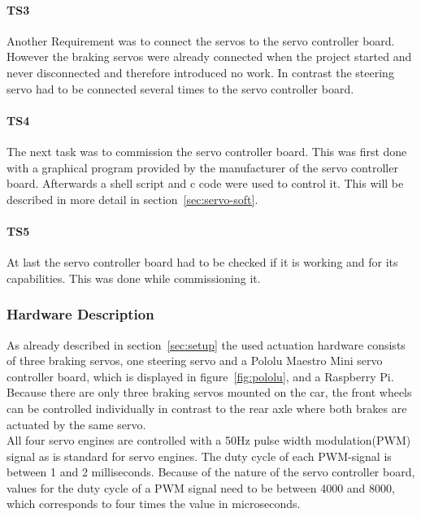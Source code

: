 \paragraph{\textbf{TS3}}
Another Requirement was to connect the servos to the servo controller board. However the braking servos were already connected when the project started and never disconnected and therefore introduced no work. In contrast the steering servo had to be connected several times to the servo controller board.

\paragraph{\textbf{TS4}}
The next task was to commission the servo controller board. This was first done with a graphical program provided by the manufacturer of the servo controller board. Afterwards a shell script and c code were used to control it. This will be described in more detail in section~\ref{sec:servo-soft}.

\paragraph{\textbf{TS5}}
At last the servo controller board had to be checked if it is working and for its capabilities. This was done while commissioning it.

\subsubsection{Hardware Description}
\label{sec:servo-hard}
As already described in section~\ref{sec:setup} the used actuation hardware consists of three braking servos, one steering servo and a Pololu Maestro Mini servo controller board, which is displayed in figure~\ref{fig:pololu}, and a Raspberry Pi. Because there are only three braking servos mounted on the car, the front wheels can be controlled individually in contrast to the rear axle where both brakes are actuated by the same servo.\\

All four servo engines are controlled with a 50Hz pulse width modulation(PWM) signal as is standard for servo engines. The duty cycle of each PWM-signal is between 1 and 2 milliseconds. Because of the nature of the servo controller board, values for the duty cycle of a PWM signal need to be between 4000 and 8000, which corresponds to four times the value in microseconds.\\

